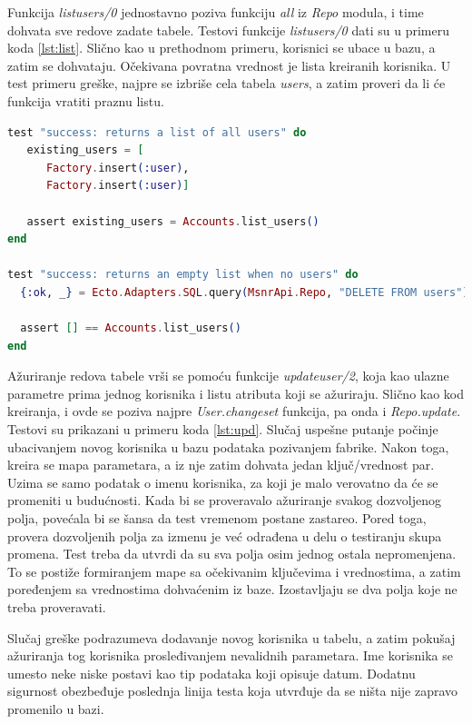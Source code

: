\documentclass[12pt,oneside]{memoir}
\begin{document}
\par Funkcija \emph{list{\textunderscore}users/0} jednostavno poziva funkciju \emph{all} iz \emph{Repo} modula, i time dohvata sve redove zadate tabele. Testovi funkcije \emph{list{\textunderscore}users/0} dati su u primeru koda \ref{lst:list}. Slično kao u prethodnom primeru, korisnici se ubace u bazu, a zatim se dohvataju. Očekivana povratna vrednost je lista kreiranih korisnika. U test primeru greške, najpre se izbriše cela tabela \emph{users}, a zatim proveri da li će funkcija vratiti praznu listu. \\

\begin{minipage}{\linewidth}
\begin{lstlisting}[language=elixir, basicstyle=\small, caption={Testiranje funkcije \emph{list{\textunderscore}users/0}},captionpos=b, label={lst:list}]
test "success: returns a list of all users" do
   existing_users = [
      Factory.insert(:user),
      Factory.insert(:user)]
      
   assert existing_users = Accounts.list_users()
end

test "success: returns an empty list when no users" do
  {:ok, _} = Ecto.Adapters.SQL.query(MsnrApi.Repo, "DELETE FROM users")

  assert [] == Accounts.list_users()
end
\end{lstlisting}
\end{minipage}

\par Ažuriranje redova tabele vrši se pomoću funkcije \emph{update{\textunderscore}user/2}, koja kao ulazne parametre prima jednog korisnika i listu atributa koji se ažuriraju. Slično kao kod kreiranja, i ovde se poziva najpre \emph{User.changeset} funkcija, pa onda i \emph{Repo.update}. Testovi su prikazani u primeru koda \ref{lst:upd}. Slučaj uspešne putanje počinje ubacivanjem novog korisnika u bazu podataka pozivanjem fabrike. Nakon toga, kreira se mapa parametara, a iz nje zatim dohvata jedan ključ/vrednost par. Uzima se samo podatak o imenu korisnika, za koji je malo verovatno da će se promeniti u budućnosti. Kada bi se proveravalo ažuriranje svakog dozvoljenog polja, povećala bi se šansa da test vremenom postane zastareo. Pored toga, provera dozvoljenih polja za izmenu je već odrađena u delu o testiranju skupa promena. Test treba da utvrdi da su sva polja osim jednog ostala nepromenjena. To se postiže formiranjem mape sa očekivanim ključevima i vrednostima, a zatim poređenjem sa vrednostima dohvaćenim iz baze. Izostavljaju se dva polja koje ne treba proveravati. 
\par Slučaj greške podrazumeva dodavanje novog korisnika u tabelu, a zatim pokušaj ažuriranja tog korisnika prosleđivanjem nevalidnih parametara. Ime korisnika se umesto neke niske postavi kao tip podataka koji opisuje datum. Dodatnu sigurnost obezbeđuje poslednja linija testa koja utvrđuje da se ništa nije zapravo promenilo u bazi. \\
\end{document}
